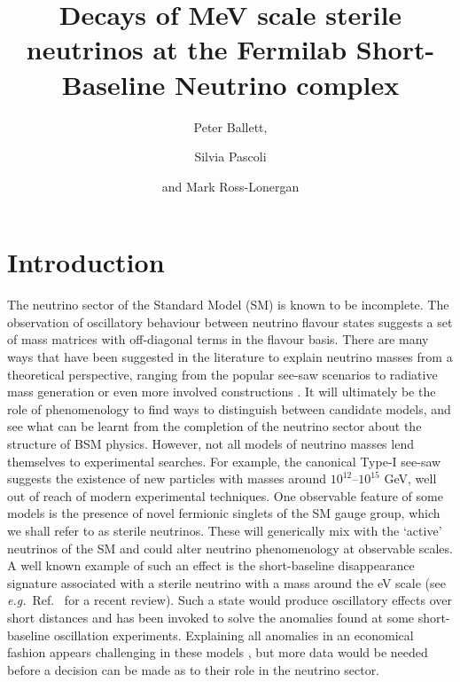 \documentclass[11pt, a4paper]{article}
\title{Decays of MeV scale sterile neutrinos at the Fermilab Short-Baseline Neutrino complex}
\author{Peter Ballett,}
\author{Silvia Pascoli}
\author{and Mark Ross-Lonergan}
\affiliation{Institute for Particle Physics Phenomenology, Department of
Physics, Durham University, South Road, Durham DH1 3LE, United Kingdom}
\newcommand{\refref}[1]{Ref.~\cite{#1}}
\def\eg{\emph{e.g.}}
\begin{document}
 

\maketitle

\section{Introduction}

The neutrino sector of the Standard Model (SM) is known to be incomplete. The
observation of oscillatory behaviour between neutrino flavour states suggests a
set of mass matrices with off-diagonal terms in the flavour basis. There are
many ways that have been suggested in the literature to explain neutrino masses
from a theoretical perspective, ranging from the popular see-saw scenarios
\cite{Minkowski:1977sc, GellMann:1980vs, Mohapatra:1979ia} to radiative mass
generation \cite{Zee:1980ai,Babu:1988ki} or even more involved constructions \cite{XXX}. It will
ultimately be the role of phenomenology to find ways to distinguish between
candidate models, and see what can be learnt from the completion of the
neutrino sector about the structure of BSM physics.
%
However, not all models of neutrino masses lend themselves to experimental
searches. For example, the canonical Type-I see-saw \cite{Minkowski:1977sc,
GellMann:1980vs, Mohapatra:1979ia} suggests the existence of new particles with
masses around $10^{12}$--$10^{15}$ GeV, well out of reach of modern
experimental techniques.  One observable feature of some models is the presence
of novel fermionic singlets of the SM gauge group, which we shall refer to as
sterile neutrinos.  These will generically mix with the `active' neutrinos of
the SM and could alter neutrino phenomenology at observable scales. 
%
A well known example of such an effect is the short-baseline disappearance
signature associated with a sterile neutrino with a mass around the eV scale
(see \eg\ \refref{Gariazzo:2015rra} for a recent review). Such a state would
produce oscillatory effects over short distances and has been invoked to solve
the anomalies found at some short-baseline oscillation experiments.  Explaining
all anomalies in an economical fashion appears challenging in these models
\cite{Kopp:2013vaa,Conrad:2012qt}, but more data would be needed before a decision can be
made as to their role in the neutrino sector.
\end{document}
